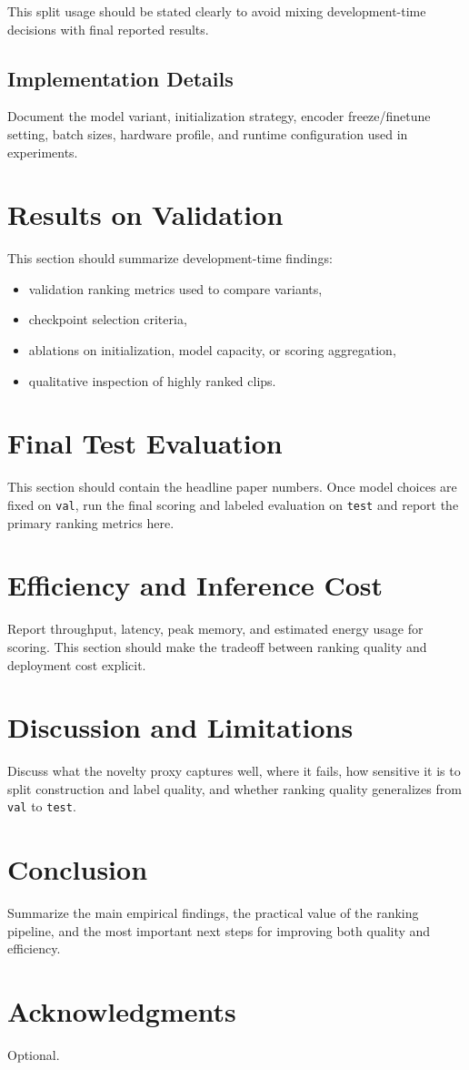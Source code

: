\documentclass[10pt,twocolumn,letterpaper]{article}
\begin{document}
This split usage should be stated clearly to avoid mixing development-time decisions with final reported results.

\subsection{Implementation Details}
Document the model variant, initialization strategy, encoder freeze/finetune setting, batch sizes, hardware profile, and runtime configuration used in experiments.

\section{Results on Validation}
This section should summarize development-time findings:
\begin{itemize}
    \item validation ranking metrics used to compare variants,
    \item checkpoint selection criteria,
    \item ablations on initialization, model capacity, or scoring aggregation,
    \item qualitative inspection of highly ranked clips.
\end{itemize}

\section{Final Test Evaluation}
This section should contain the headline paper numbers. Once model choices are fixed on \texttt{val}, run the final scoring and labeled evaluation on \texttt{test} and report the primary ranking metrics here.

\section{Efficiency and Inference Cost}
Report throughput, latency, peak memory, and estimated energy usage for scoring. This section should make the tradeoff between ranking quality and deployment cost explicit.

\section{Discussion and Limitations}
Discuss what the novelty proxy captures well, where it fails, how sensitive it is to split construction and label quality, and whether ranking quality generalizes from \texttt{val} to \texttt{test}.

\section{Conclusion}
Summarize the main empirical findings, the practical value of the ranking pipeline, and the most important next steps for improving both quality and efficiency.

\section*{Acknowledgments}
Optional.

{\small


}
\end{document}
